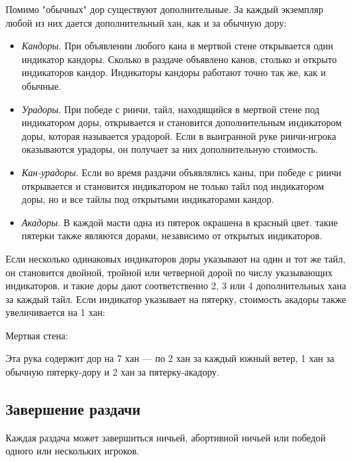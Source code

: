Помимо "обычных" дор существуют дополнительные. За каждый экземпляр любой из них дается дополнительный хан, как и за обычную дору:

\begin{itemize}
	\item \textit{Кандоры}. При объявлении любого кана в мертвой стене открывается один индикатор кандоры. Сколько в раздаче объявлено канов, столько и открыто индикаторов кандор. Индикаторы кандоры работают точно так же, как и обычные.
	\item \textit{Урадоры}. При победе с риичи, тайл, находящийся в мертвой стене под индикатором доры, открывается и становится дополнительным индикатором доры, которая называется урадорой. Если в выигранной руке риичи-игрока оказываются урадоры, он получает за них дополнительную стоимость.
	\item \textit{Кан-урадоры}. Если во время раздачи объявлялись каны, при победе с риичи открывается и становится индикатором не только тайл под индикатором доры, но и все тайлы под открытыми индикаторами кандор.
	\item\textit{Акадоры}. В каждой масти одна из пятерок окрашена в красный цвет. такие пятерки также являются дорами, независимо от открытых индикаторов.
\end{itemize}

Если несколько одинаковых индикаторов доры указывают на один и тот же тайл, он становится двойной, тройной или четверной дорой по числу указывающих индикаторов, и такие доры дают соответственно 2, 3 или 4 дополнительных хана за каждый тайл. Если индикатор указывает на пятерку, стоимость акадоры также увеличивается на 1 хан:

\begin{example}


	Мертвая стена:
	\vspace{5mm}

	Эта рука содержит дор на 7 хан --- по 2 хан за каждый южный ветер, 1 хан за обычную пятерку-дору и 2 хан за пятерку-акадору.

\end{example}

\subsection{Завершение раздачи}

Каждая раздача может завершиться ничьей, абортивной ничьей или победой одного или нескольких игроков.


